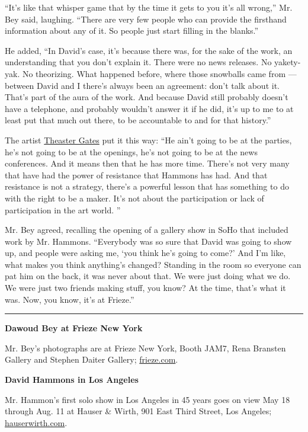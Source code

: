 ``It's like that whisper game that by the time it gets to you it's all
wrong,'' Mr. Bey said, laughing. ``There are very few people who can
provide the firsthand information about any of it. So people just start
filling in the blanks.''

He added, ``In David's case, it's because there was, for the sake of the
work, an understanding that you don't explain it. There were no news
releases. No yakety-yak. No theorizing. What happened before, where
those snowballs came from --- between David and I there's always been an
agreement: don't talk about it. That's part of the aura of the work. And
because David still probably doesn't have a telephone, and probably
wouldn't answer it if he did, it's up to me to at least put that much
out there, to be accountable to and for that history.''

The artist \href{https://www.theastergates.com/}{Theaster Gates} put it
this way: ``He ain't going to be at the parties, he's not going to be at
the openings, he's not going to be at the news conferences. And it means
then that he has more time. There's not very many that have had the
power of resistance that Hammons has had. And that resistance is not a
strategy, there's a powerful lesson that has something to do with the
right to be a maker. It's not about the participation or lack of
participation in the art world. ''

Mr. Bey agreed, recalling the opening of a gallery show in SoHo that
included work by Mr. Hammons. ``Everybody was so sure that David was
going to show up, and people were asking me, `you think he's going to
come?' And I'm like, what makes you think anything's changed? Standing
in the room so everyone can pat him on the back, it was never about
that. We were just doing what we do. We were just two friends making
stuff, you know? At the time, that's what it was. Now, you know, it's at
Frieze.''

\begin{center}\rule{0.5\linewidth}{\linethickness}\end{center}

\textbf{Dawoud Bey at Frieze New York}

Mr. Bey's photographs are at Frieze New York, Booth JAM7, Rena Bransten
Gallery and Stephen Daiter Gallery;
\href{https://frieze.com/fairs/frieze-new-york}{frieze.com}.

\textbf{David Hammons in Los Angeles}

Mr. Hammon's first solo show in Los Angeles in 45 years goes on view May
18 through Aug. 11 at Hauser \& Wirth, 901 East Third Street, Los
Angeles;
\href{https://www.hauserwirth.com/hauser-wirth-exhibitions/24162-david-hammons-los-angeles}{hauserwirth.com}.

